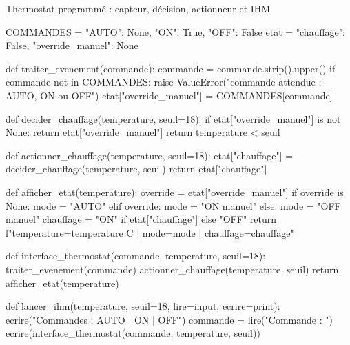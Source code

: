 \begin{codereference}{Thermostat programmé : capteur, décision, actionneur et IHM}
\begin{python}
COMMANDES = {"AUTO": None, "ON": True, "OFF": False}
etat = {"chauffage": False, "override_manuel": None}


def traiter_evenement(commande):
    commande = commande.strip().upper()
    if commande not in COMMANDES:
        raise ValueError("commande attendue : AUTO, ON ou OFF")
    etat["override_manuel"] = COMMANDES[commande]


def decider_chauffage(temperature, seuil=18):
    if etat["override_manuel"] is not None:
        return etat["override_manuel"]
    return temperature < seuil


def actionner_chauffage(temperature, seuil=18):
    etat["chauffage"] = decider_chauffage(temperature, seuil)
    return etat["chauffage"]


def afficher_etat(temperature):
    override = etat["override_manuel"]
    if override is None:
        mode = "AUTO"
    elif override:
        mode = "ON manuel"
    else:
        mode = "OFF manuel"
    chauffage = "ON" if etat["chauffage"] else "OFF"
    return f"temperature={temperature} C | mode={mode} | chauffage={chauffage}"


def interface_thermostat(commande, temperature, seuil=18):
    traiter_evenement(commande)
    actionner_chauffage(temperature, seuil)
    return afficher_etat(temperature)


def lancer_ihm(temperature, seuil=18, lire=input, ecrire=print):
    ecrire("Commandes : AUTO | ON | OFF")
    commande = lire("Commande : ")
    ecrire(interface_thermostat(commande, temperature, seuil))
\end{python}
\end{codereference}

